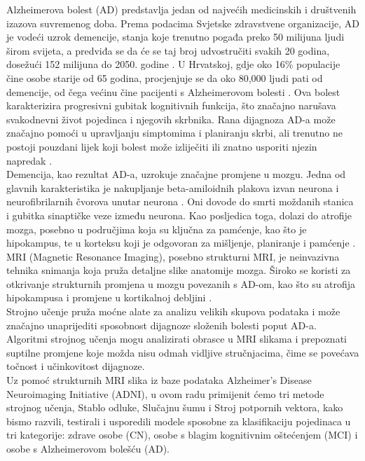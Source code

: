 \documentclass[zavrsnirad,upload]{fer}
\begin{document}
Alzheimerova bolest (AD) predstavlja jedan od najvećih medicinskih i društvenih izazova suvremenog doba. Prema podacima Svjetske zdravstvene organizacije, AD je vodeći uzrok demencije, stanja koje trenutno pogađa preko 50 milijuna ljudi širom svijeta, a predviđa se da će se taj broj udvostručiti svakih 20 godina, dosežući 152 milijuna do 2050. godine \cite{PMID:29763097}. U Hrvatskoj, gdje oko 16\% populacije čine osobe starije od 65 godina, procjenjuje se da oko 80,000 ljudi pati od demencije, od čega većinu čine pacijenti s Alzheimerovom bolesti \cite{MIMICA2010409}. Ova bolest karakterizira progresivni gubitak kognitivnih funkcija, što značajno narušava svakodnevni život pojedinca i njegovih skrbnika. Rana dijagnoza AD-a može značajno pomoći u upravljanju simptomima i planiranju skrbi, ali trenutno ne postoji pouzdani lijek koji bolest može izliječiti ili znatno usporiti njezin napredak \cite{PMID:29763097}.
\\
Demencija, kao rezultat AD-a, uzrokuje značajne promjene u mozgu. Jedna od glavnih karakteristika je nakupljanje beta-amiloidnih plakova izvan neurona i neurofibrilarnih čvorova unutar neurona \cite{10.1007/s00500-020-05292-x}. Oni dovode do smrti moždanih stanica i gubitka sinaptičke veze između neurona. Kao posljedica toga, dolazi do atrofije mozga, posebno u područjima koja su ključna za pamćenje, kao što je hipokampus, te u korteksu koji je odgovoran za mišljenje, planiranje i pamćenje \cite{10.1212/WNL.0b013e3181c3f293}.
\\
MRI (Magnetic Resonance Imaging), posebno strukturni MRI, je neinvazivna tehnika snimanja koja pruža detaljne slike anatomije mozga. Široko se koristi za otkrivanje strukturnih promjena u mozgu povezanih s AD-om, kao što su atrofija hipokampusa i promjene u kortikalnoj debljini \cite{10.3389/fnins.2015.00307}. 
\\
Strojno učenje pruža moćne alate za analizu velikih skupova podataka i može značajno unaprijediti sposobnost dijagnoze složenih bolesti poput AD-a. Algoritmi strojnog učenja mogu analizirati obrasce u MRI slikama i prepoznati suptilne promjene koje možda nisu odmah vidljive stručnjacima, čime se povećava točnost i učinkovitost dijagnoze.
\\
Uz pomoć strukturnih MRI slika iz baze podataka Alzheimer’s Disease Neuroimaging Initiative (ADNI), u ovom radu primijenit ćemo tri metode strojnog učenja, Stablo odluke, Slučajnu šumu i Stroj potpornih vektora, kako bismo razvili, testirali i usporedili modele sposobne za klasifikaciju pojedinaca u tri kategorije: zdrave osobe (CN), osobe s blagim kognitivnim oštećenjem (MCI) i osobe s Alzheimerovom bolešću (AD).
\end{document}
